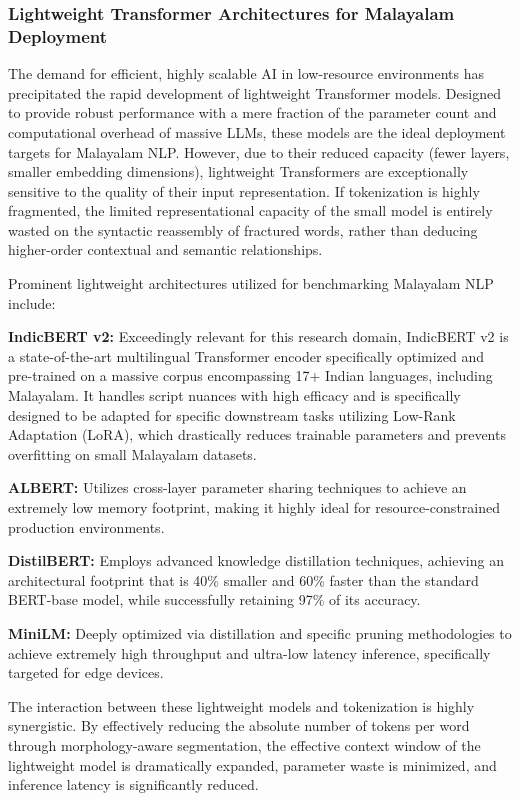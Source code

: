 \documentclass[12pt]{article}
\begin{document}
	
	\subsubsection{Lightweight Transformer Architectures for Malayalam Deployment 
	}
	
	The demand for efficient, highly scalable AI in low-resource environments has precipitated the rapid development of lightweight Transformer models. Designed to provide robust performance with a mere fraction of the parameter count and computational overhead of massive LLMs, these models are the ideal deployment targets for Malayalam NLP. However, due to their reduced capacity (fewer layers, smaller embedding dimensions), lightweight Transformers are exceptionally sensitive to the quality of their input representation. If tokenization is highly fragmented, the limited representational capacity of the small model is entirely wasted on the syntactic reassembly of fractured words, rather than deducing higher-order contextual and semantic relationships. 
	
	Prominent lightweight architectures utilized for benchmarking Malayalam NLP include: 
	
	\textbf{IndicBERT v2:} Exceedingly relevant for this research domain, IndicBERT v2 is a state-of-the-art multilingual Transformer encoder specifically optimized and pre-trained on a massive corpus encompassing 17+ Indian languages, including Malayalam. It handles script nuances with high efficacy and is specifically designed to be adapted for specific downstream tasks utilizing Low-Rank Adaptation (LoRA), which drastically reduces trainable parameters and prevents overfitting on small Malayalam datasets.
	
	\textbf{ALBERT:} Utilizes cross-layer parameter sharing techniques to achieve an extremely low memory footprint, making it highly ideal for resource-constrained production environments. 
	
	\textbf{DistilBERT:} Employs advanced knowledge distillation techniques, achieving an architectural footprint that is 40\% smaller and 60\% faster than the standard BERT-base model, while successfully retaining 97\% of its accuracy. \cite{sanh2019distilbert}
	
	\textbf{MiniLM:} Deeply optimized via distillation and specific pruning methodologies to achieve extremely high throughput and ultra-low latency inference, specifically targeted for edge devices. 
	
	The interaction between these lightweight models and tokenization is highly synergistic. By effectively reducing the absolute number of tokens per word through morphology-aware segmentation, the effective context window of the lightweight model is dramatically expanded, parameter waste is minimized, and inference latency is significantly reduced. 
	
\end{document}
